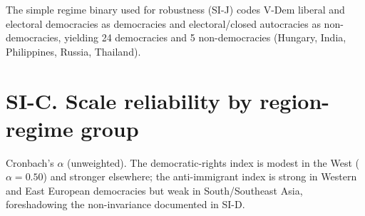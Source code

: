 The simple regime binary used for robustness (SI-J) codes V-Dem liberal and electoral democracies as democracies and electoral/closed autocracies as non-democracies, yielding 24 democracies and 5 non-democracies (Hungary, India, Philippines, Russia, Thailand).

\clearpage
\section{SI-C. Scale reliability by region-regime group}\label{si-c.-scale-reliability-by-region-regime-group}

Cronbach's \(\alpha\) (unweighted). The democratic-rights index is modest in the West (\(\alpha = 0.50\)) and stronger elsewhere; the anti-immigrant index is strong in Western and East European democracies but weak in South/Southeast Asia, foreshadowing the non-invariance documented in SI-D.

